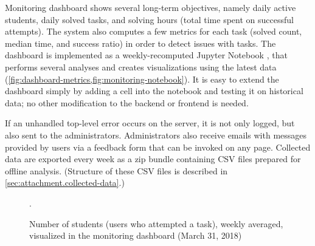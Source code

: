 Monitoring dashboard
  shows several long-term objectives, %
  namely daily active students, daily solved tasks, and
  solving hours (total time spent on successful attempts).
  The system also computes a few metrics for each task
  (solved count, median time, and success ratio) in order to detect
  issues with tasks. %
The dashboard is implemented as a weekly-recomputed Jupyter Notebook \cite{jupyter-notebooks},
  that performs several analyses
  and creates visualizations using the latest data
  (\cref{fig:dashboard-metrics,fig:monitoring-notebook}).
  It is easy to extend the dashboard simply by adding
  a cell into the notebook and testing it on historical data;
  no other modification to the backend or frontend is needed.

  If an unhandled top-level error occurs on the server,
  it is not only logged, but also sent to the administrators.
  Administrators also receive emails with messages provided by users via
  a feedback form that can be invoked on any page.
  Collected data are exported every week as a zip bundle containing
  CSV files prepared for %
  offline analysis.
  (Structure of these CSV files is described in \cref{sec:attachment.collected-data}.)

\begin{figure}[htb]
\centering
{}
\caption{%
  Number of students (users who attempted a task), weekly averaged, visualized
  in the monitoring dashboard (March 31, 2018)}.
\label{fig:dashboard-metrics}
\end{figure}

